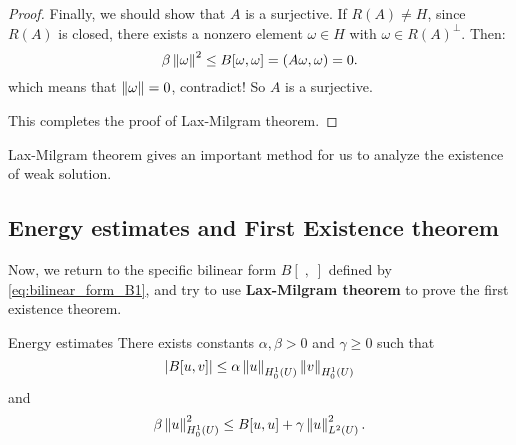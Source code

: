 \begin{proof}
    Finally, we should show that $A$ is a surjective. If $R(A)\neq H$, since $R(A)$ is closed, there exists a nonzero element  $\omega\in H$ with $\omega\in R(A)^{\bot}$. Then: 
    \begin{equation}
        \beta\left\|\omega\right\|^{2}\le B[\omega,\omega]=(A\omega,\omega)=0.
    \end{equation} 
    which means that $\left\|\omega\right\|=0$, contradict! So $A$ is a surjective.

    This completes the proof of Lax-Milgram theorem.
\end{proof}

Lax-Milgram theorem gives an important method for us to analyze the existence of weak solution.
\subsection{Energy estimates and First Existence theorem}
Now, we return to the specific bilinear form $B[\;,\;]$ defined by \eqref{eq:bilinear_form_B1}, and try to use \textbf{Lax-Milgram theorem} to prove the first existence theorem.
\begin{theorem}{Energy estimates}
\label{thm:energy_estimate}
There exists constants $\alpha,\beta>0$ and $\gamma\ge 0$ such that 
\begin{equation}
    \label{eq:bounded_B}
    |B[u,v]|\le\alpha\left\|u\right\|_{H_{0}^{1}(U)}\left\|v\right\|_{H_{0}^{1}(U)}
\end{equation}
and 
\begin{equation}
    \label{eq:elliptic_B}
    \beta\left\|u\right\|_{H_{0}^{1}(U)}^{2}\le B[u,u]+\gamma\left\|u\right\|_{L^{2}(U)}^{2}.
\end{equation}
\end{theorem}
